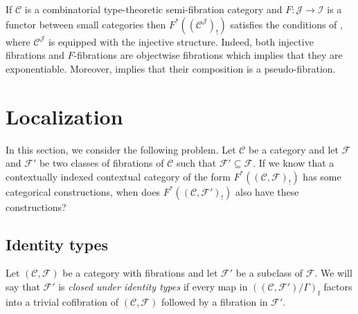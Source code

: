\documentclass[reqno]{amsart}
\theoremstyle{definition}
\theoremstyle{remark}
\newcommand{\fs}[1]{\mathrm{#1}}
\newcommand{\scat}[1]{\mathcal{#1}}
\newcommand{\Fib}{\mathcal{F}}
\numberwithin{figure}{section}
\begin{document}
\begin{example}
If $\scat{C}$ is a combinatorial type-theoretic semi-fibration category and $F : \scat{J} \to \scat{I}$ is a functor between small categories
then $F^*((\scat{C}^\scat{J})_!)$ satisfies the conditions of , where $\scat{C}^\scat{J}$ is equipped with the injective structure.
Indeed, both injective fibrations and $F$-fibrations are objectwise fibrations which implies that they are exponentiable.
Moreover,  implies that their composition is a pseudo-fibration.
\end{example}

\section{Localization}
\label{sec:loc}

In this section, we consider the following problem.
Let $\scat{C}$ be a category and let $\Fib$ and $\Fib'$ be two classes of fibrations of $\scat{C}$ such that $\Fib' \subseteq \Fib$.
If we know that a contextually indexed contextual category of the form $F^*((\scat{C},\Fib)_!)$ has some categorical constructions, when does $F^*((\scat{C},\Fib')_!)$ also have these constructions?


\subsection{Identity types}

Let $(\scat{C},\Fib)$ be a category with fibrations and let $\Fib'$ be a subclass of $\Fib$.
We will say that $\Fib'$ is \emph{closed under identity types} if every map in $((\scat{C},\Fib')/\Gamma)_\fs{f}$ factors into a trivial cofibration of $(\scat{C},\Fib)$ followed by a fibration in $\Fib'$.
\end{document}
